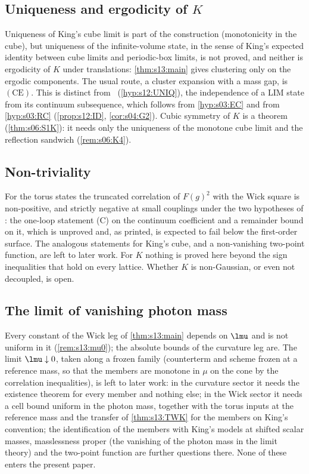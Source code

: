 \subsection{Uniqueness and ergodicity of \texorpdfstring{$K$}{K}}

Uniqueness of King's cube limit is part of the construction (monotonicity in the cube), but uniqueness of the infinite-volume state, in the sense of King's expected identity between cube limits and periodic-box limits, is not proved, and neither is ergodicity of $K$ under translations: \cref{thm:s13:main} gives clustering only on the ergodic components. The usual route, a cluster expansion with a mass gap, is $(\mathrm{CE})$. This is distinct from \UNIQ\ (\cref{hyp:s12:UNIQ}), the independence of a LIM state from its continuum subsequence, which follows from \cref{hyp:s03:EC} and from \cref{hyp:s03:RC} (\cref{prop:s12:ID}, \cref{cor:s04:G2}). Cubic symmetry of $K$ is a theorem (\cref{thm:s06:S1K}): it needs only the uniqueness of the monotone cube limit and the reflection sandwich (\cref{rem:s06:K4}).

\subsection{Non-triviality}

For the torus states the truncated correlation of $F(g)^2$ with the Wick square is non-positive, and strictly negative at small couplings under the two hypotheses of \cite[thm:NT-cond]{SymPhase}: the one-loop statement (C) on the continuum coefficient and a remainder bound on it, which is unproved and, as printed, is expected to fail below the first-order surface. The analogous statements for King's cube, and a non-vanishing two-point function, are left to later work. For $K$ nothing is proved here beyond the sign inequalities that hold on every lattice. Whether $K$ is non-Gaussian, or even not decoupled, is open.

\subsection{The limit of vanishing photon mass}

Every constant of the Wick leg of \cref{thm:s13:main} depends on $\lmu$ and is not uniform in it (\cref{rem:s13:mu0}); the absolute bounds of the curvature leg are. The limit $\lmu\downarrow0$, taken along a frozen family (counterterm and scheme frozen at a reference mass, so that the members are monotone in $\mu$ on the cone by the correlation inequalities), is left to later work: in the curvature sector it needs the existence theorem for every member and nothing else; in the Wick sector it needs a cell bound uniform in the photon mass, together with the torus inputs at the reference mass and the transfer of \cref{thm:s13:TWK} for the members on King's convention; the identification of the members with King's models at shifted scalar masses, masslessness proper (the vanishing of the photon mass in the limit theory) and the two-point function are further questions there. None of these enters the present paper.

